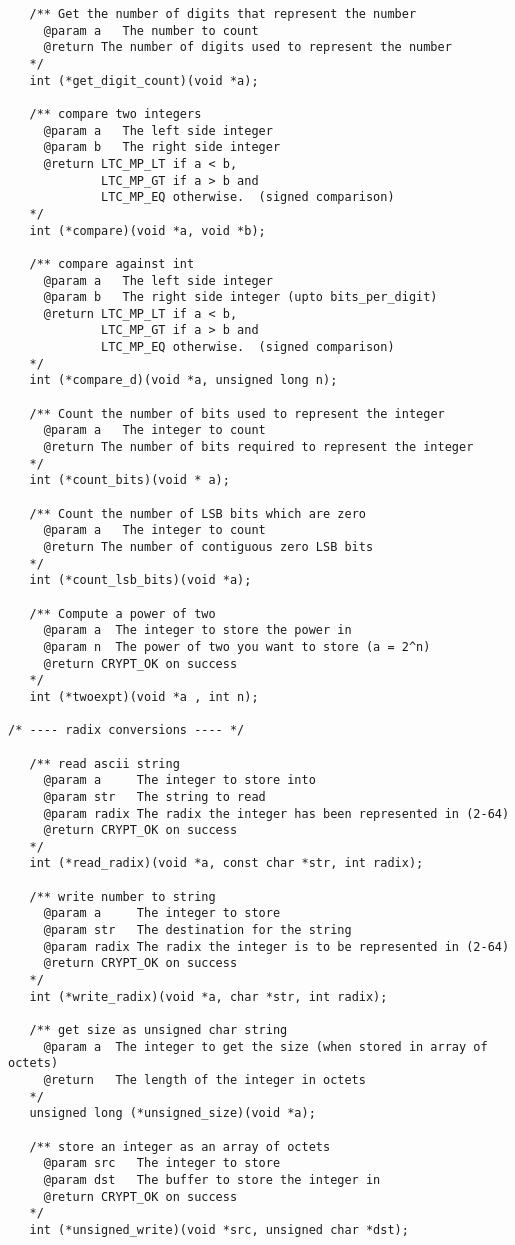 \documentclass[synpaper]{book}
\begin{document}
\begin{small}
\begin{verbatim}
   /** Get the number of digits that represent the number
     @param a   The number to count
     @return The number of digits used to represent the number
   */
   int (*get_digit_count)(void *a);

   /** compare two integers
     @param a   The left side integer
     @param b   The right side integer
     @return LTC_MP_LT if a < b,
             LTC_MP_GT if a > b and
             LTC_MP_EQ otherwise.  (signed comparison)
   */
   int (*compare)(void *a, void *b);

   /** compare against int
     @param a   The left side integer
     @param b   The right side integer (upto bits_per_digit)
     @return LTC_MP_LT if a < b,
             LTC_MP_GT if a > b and
             LTC_MP_EQ otherwise.  (signed comparison)
   */
   int (*compare_d)(void *a, unsigned long n);

   /** Count the number of bits used to represent the integer
     @param a   The integer to count
     @return The number of bits required to represent the integer
   */
   int (*count_bits)(void * a);

   /** Count the number of LSB bits which are zero
     @param a   The integer to count
     @return The number of contiguous zero LSB bits
   */
   int (*count_lsb_bits)(void *a);

   /** Compute a power of two
     @param a  The integer to store the power in
     @param n  The power of two you want to store (a = 2^n)
     @return CRYPT_OK on success
   */
   int (*twoexpt)(void *a , int n);

/* ---- radix conversions ---- */

   /** read ascii string
     @param a     The integer to store into
     @param str   The string to read
     @param radix The radix the integer has been represented in (2-64)
     @return CRYPT_OK on success
   */
   int (*read_radix)(void *a, const char *str, int radix);

   /** write number to string
     @param a     The integer to store
     @param str   The destination for the string
     @param radix The radix the integer is to be represented in (2-64)
     @return CRYPT_OK on success
   */
   int (*write_radix)(void *a, char *str, int radix);

   /** get size as unsigned char string
     @param a  The integer to get the size (when stored in array of octets)
     @return   The length of the integer in octets
   */
   unsigned long (*unsigned_size)(void *a);

   /** store an integer as an array of octets
     @param src   The integer to store
     @param dst   The buffer to store the integer in
     @return CRYPT_OK on success
   */
   int (*unsigned_write)(void *src, unsigned char *dst);


\end{verbatim}
\end{small}
\end{document}
